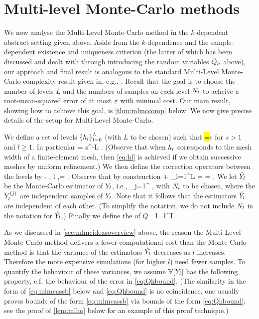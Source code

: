 \section{Multi-level Monte-Carlo methods}\label{sec:mlmcan}
We now analyse the Multi-Level Monte-Carlo method in the $k$-dependent abstract setting given above. Aside from the $k$-dependence and the sample-dependent existence and uniqueness criterion (the latter of which has been discussed and dealt with through introducing the random variables $\widetilde{Q}_{h}$ above), our approach and final result is analogous to the standard Multi-Level Monte-Carlo complexity result given in, e.g., \cite[Theorem 1]{ClGiScTe:11}. Recall that the goal is to choose the number of levels $L$ and the numbers of samples on each level $N_{l}$ to acheive a root-mean-squared error of at most $\varepsilon$ with minimal cost. Our main result, showing how to achieve this goal, is \cref{thm:mlmccomp} below. We now give precise details of the setup for Multi-Level Monte-Carlo.

We define a set of levels $\set{\hl}_{l=0}^L$ (with $L$ to be chosen) such that
\beq\label{eq:hl}
\hl =\frac{\hlmo}s
\eeq
for $s > 1$ and $l \geq 1$. In particular
\beq\label{eq:hL}
\hL = s^{-L} \hz.
\eeq
(Observe that when $h_{l}$ corresponds to the mesh width of a finite-element mesh, then \cref{eq:hl} is achieved if we obtain successive meshes by uniform refinement.) We then define the correction operators between the levels by
\beq\label{eq:Yldef}
\Yl \de \Qhltilde - \Qhlmotilde, l ,\quad \Yz = \Qhztilde.
\eeq
Observe that by construction
\beq\label{eq:expectationtelescope}
\EXP{\Yz} + \sum_{l=1}^L \EXP{\Yl} =  = \EXP{\QhLtilde}.
\eeq
We let $\hat{Y_{l}}$ be the Monte-Carlo estimator of $Y_{l}$, i.e.,
 \beq\label{eq:Ylhatdef}
\Ylhat \de {}\sum_{j=1}^{\Nl} \Ylj,
 \eeq
 with $N_{l}$ to be chosen, where the $Y_{l}^{(j)}$ are independent samples of $Y_{l}$. Note that it follows that the estimators $\hat{Y_{l}}$ are independent of each other. (To simplify the notation, we do not include $N_{l}$ in the notation for $\hat{Y_{l}}$.) Finally we define the  of $Q$
 \beqs
 \QhatMLhL \de \sum_{l=1}^L \Ylhat.
 \eeqs

 As we discussed in \cref{sec:mlmcideasoverview} above, the reason the Multi-Level Monte-Carlo method delivers a lower computational cost than the Monte-Carlo method is that the variance of the estimators $\hat{Y_{l}}$ decreases as $l$ increases. Therefore the more expensive simulations (for higher $l$) need fewer samples. To quantify the behaviour of these variances, we assume $\VAR{\Yl}$ has the following property, c.f. the behaviour of the error in \cref{eq:Qhbound}. (The similarity in the form of \cref{eq:mlmcassb} below and \cref{eq:Qhbound} is no coincidence, one usually proves bounds of the form \cref{eq:mlmcassb} via bounds of the form \cref{eq:Qhbound}; see the proof of \cref{lem:mlho} below for an example of this proof technique.)

